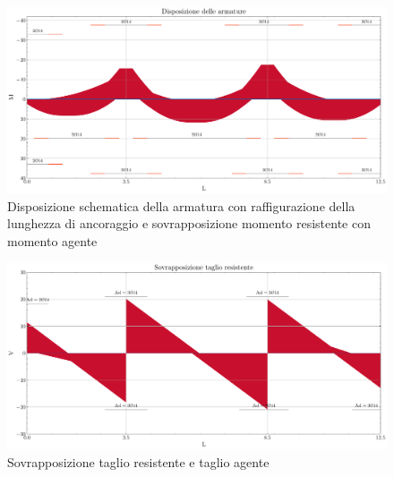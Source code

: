 \begin{figure}[htb]
    \centering
    \includegraphics[width=\textwidth]{IMG/ULS_M_DisposioneArmature_solaio.pdf}
    \caption{Disposizione schematica della armatura con raffigurazione della lunghezza di ancoraggio e sovrapposizione momento resistente con momento agente}
    \label{fig:ULS_M_ULS_M_DisposioneArmature_solaio}
\end{figure}
\begin{figure}[htb]
    \centering
    \includegraphics[width=\textwidth]{IMG/ULS_V_DisposioneArmature_solaio.pdf}
    \caption{Sovrapposizione taglio resistente e taglio agente}
    \label{fig:ULS_M_ULS_V_DisposioneArmature_solaio}
\end{figure}